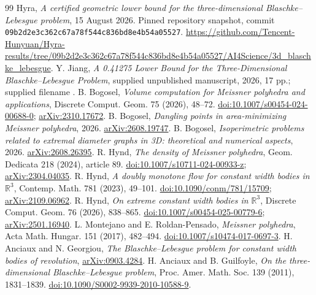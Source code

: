 \documentclass[11pt]{article}
\theoremstyle{remark}\newtheorem{remark}[theorem]{Remark}
\begin{document}
\begin{thebibliography}{99}
 Hyra, \emph{A certified geometric lower bound for the three-dimensional Blaschke--Lebesgue problem}, 15 August 2026. Pinned repository snapshot, commit \texttt{09b2d2e3c362c67a78f544c836bd8e4b54a05527}. \url{https://github.com/Tencent-Hunyuan/Hyra-results/tree/09b2d2e3c362c67a78f544c836bd8e4b54a05527/AI4Science/3d_blaschke_lebesgue}.
 Y. Jiang, \emph{A 0.41275 Lower Bound for the Three-Dimensional Blaschke--Lebesgue Problem}, supplied unpublished manuscript, 2026, 17 pp.; supplied filename .
 B. Bogosel, \emph{Volume computation for Meissner polyhedra and applications}, Discrete Comput. Geom. 75 (2026), 48--72. \href{https://doi.org/10.1007/s00454-024-00688-0}{doi:10.1007/s00454-024-00688-0}; \href{https://arxiv.org/abs/2310.17672}{arXiv:2310.17672}.
 B. Bogosel, \emph{Dangling points in area-minimizing Meissner polyhedra}, 2026. \href{https://arxiv.org/abs/2608.19747}{arXiv:2608.19747}.
 B. Bogosel, \emph{Isoperimetric problems related to extremal diameter graphs in 3D: theoretical and numerical aspects}, 2026. \href{https://arxiv.org/abs/2608.26395}{arXiv:2608.26395}.
 R. Hynd, \emph{The density of Meissner polyhedra}, Geom. Dedicata 218 (2024), article 89. \href{https://doi.org/10.1007/s10711-024-00933-z}{doi:10.1007/s10711-024-00933-z}; \href{https://arxiv.org/abs/2304.04035}{arXiv:2304.04035}.
 R. Hynd, \emph{A doubly monotone flow for constant width bodies in $\mathbb R^3$}, Contemp. Math. 781 (2023), 49--101. \href{https://doi.org/10.1090/conm/781/15709}{doi:10.1090/conm/781/15709}; \href{https://arxiv.org/abs/2109.06962}{arXiv:2109.06962}.
 R. Hynd, \emph{On extreme constant width bodies in $\mathbb R^3$}, Discrete Comput. Geom. 76 (2026), 838--865. \href{https://doi.org/10.1007/s00454-025-00779-6}{doi:10.1007/s00454-025-00779-6}; \href{https://arxiv.org/abs/2501.16940}{arXiv:2501.16940}.
 L. Montejano and E. Roldan-Pensado, \emph{Meissner polyhedra}, Acta Math. Hungar. 151 (2017), 482--494. \href{https://doi.org/10.1007/s10474-017-0697-3}{doi:10.1007/s10474-017-0697-3}.
 H. Anciaux and N. Georgiou, \emph{The Blaschke--Lebesgue problem for constant width bodies of revolution}, \href{https://arxiv.org/abs/0903.4284}{arXiv:0903.4284}.
 H. Anciaux and B. Guilfoyle, \emph{On the three-dimensional Blaschke--Lebesgue problem}, Proc. Amer. Math. Soc. 139 (2011), 1831--1839. \href{https://doi.org/10.1090/S0002-9939-2010-10588-9}{doi:10.1090/S0002-9939-2010-10588-9}.

\end{thebibliography}
\end{document}
